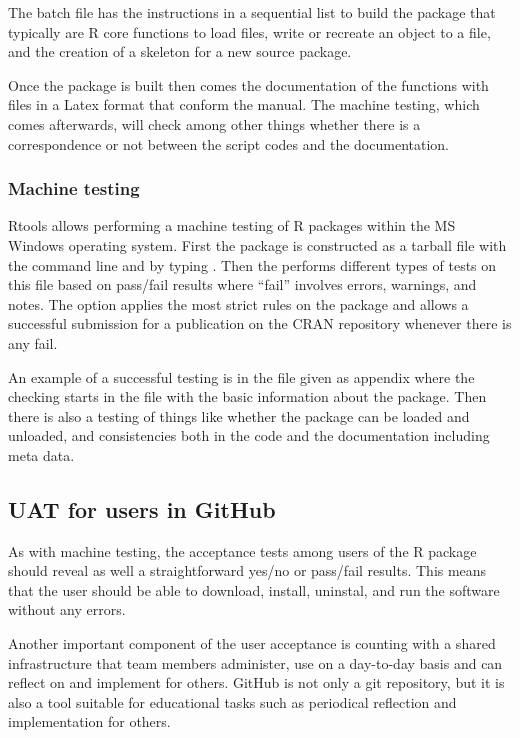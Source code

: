 \documentclass[oneside,a4paper]{memoir} %
\begin{document}
The batch file has the instructions in a sequential list to build the package that typically are \textsf{R} core functions to load files, write or recreate an object to a file, and the creation of a skeleton for a new source package.

Once the package is built then comes the documentation of the functions with files in a Latex format that conform the manual. The machine testing, which comes afterwards, will check among other things whether there is a correspondence or not between the script codes and the documentation. 


\subsubsection{Machine testing}
\textsf{Rtools} allows performing a machine testing of \textsf{R} packages within the MS Windows operating system. First the package is constructed as a tarball file with the command line and by typing . Then the  performs different types of tests on this file based on pass/fail results where \enquote{fail} involves errors, warnings, and notes. The option  applies the most strict rules on the package and allows a successful submission for a publication on the CRAN repository whenever there is any fail. 

An example of a successful testing is in the  file given as appendix where the checking starts in the  file with the basic information about the package. Then there is also a testing of things like whether the package can be loaded and unloaded, and consistencies both in the code and the documentation including meta data.



\subsection{UAT for users in GitHub}
As with machine testing, the acceptance tests among users of the \textsf{R} package should reveal as well a straightforward yes/no or pass/fail results. This means that the user should be able to download, install, uninstal, and run the software without any errors. 

Another important component of the user acceptance is counting with a shared infrastructure that team members administer, use on a day-to-day basis and can reflect on and implement for others. 
GitHub is not only a git repository, but it is also a tool suitable for educational tasks such as periodical reflection and implementation for others. 
\end{document}
